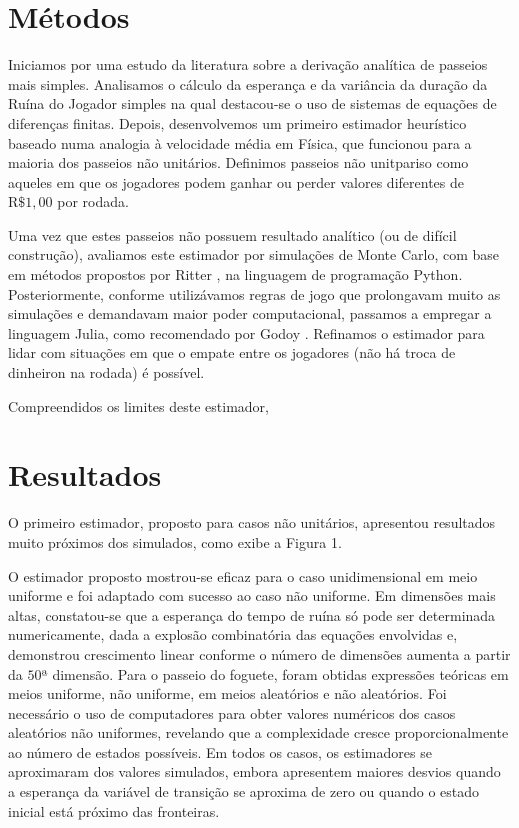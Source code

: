 \documentclass[a4paper,10pt,twocolumn]{article}
\begin{document}
\section{Métodos}

Iniciamos por uma estudo da literatura sobre a derivação analítica de passeios
mais simples. Analisamos o cálculo da esperança e da variância da duração da
Ruína do Jogador simples \cite{andel_variance_2012} na qual destacou-se o uso de
sistemas de equações de diferenças finitas. Depois, desenvolvemos um primeiro
estimador heurístico baseado numa analogia à velocidade média em Física, que
funcionou para a maioria dos passeios não unitários. Definimos passeios não
unitpariso como aqueles em que os jogadores podem ganhar ou perder valores
diferentes de $\mathrm{R}\$1,00$ por rodada.

Uma vez que estes passeios não possuem resultado analítico (ou de difícil
construção), avaliamos este estimador por simulações de Monte Carlo, com base em
métodos propostos por Ritter \cite{ritter_determining_2011}, na linguagem de
programação Python. Posteriormente, conforme utilizávamos regras de jogo que
prolongavam muito as simulações e demandavam maior poder computacional, passamos
a empregar a linguagem Julia, como recomendado por Godoy
\cite{godoy_evaluating_2023}. Refinamos o estimador para lidar com situações em
que o empate entre os jogadores (não há troca de dinheiron na rodada) é
possível.

Compreendidos os limites deste estimador,

\section{Resultados}

O primeiro estimador, proposto para casos não unitários, apresentou resultados muito
próximos dos simulados, como exibe a Figura 1.

O estimador proposto mostrou-se eficaz para o caso unidimensional em meio
uniforme e foi adaptado com sucesso ao caso não uniforme. Em dimensões mais
altas, constatou-se que a esperança do tempo de ruína só pode ser determinada
numericamente, dada a explosão combinatória das equações envolvidas e,
demonstrou crescimento linear conforme o número de dimensões aumenta a partir da
$50$ª dimensão. Para o passeio do foguete, foram obtidas expressões teóricas em
meios uniforme, não uniforme, em meios aleatórios e não aleatórios. Foi
necessário o uso de computadores para obter valores numéricos dos casos
aleatórios não uniformes, revelando que a complexidade cresce proporcionalmente
ao número de estados possíveis. Em todos os casos, os estimadores se aproximaram
dos valores simulados, embora apresentem maiores desvios quando a esperança da
variável de transição se aproxima de zero ou quando o estado inicial está
próximo das fronteiras.
\end{document}

